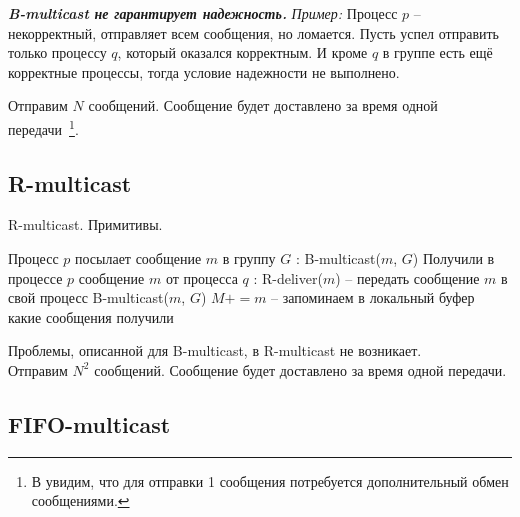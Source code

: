 \textbf{\textit{B-multicast не гарантирует надежность.}} \newline
\textit{Пример:} Процесс $p$ -- некорректный, отправляет всем сообщения, но ломается. Пусть успел отправить только процессу $q$, который оказался корректным. И кроме $q$ в группе есть ещё корректные процессы, тогда условие надежности не выполнено.

Отправим $N$ сообщений. Сообщение будет доставлено за время одной передачи~\footnote{
В  увидим, что для отправки 1 сообщения потребуется дополнительный обмен сообщениями.}.


\subsection*{R-multicast}\label{b19:part2}

\begin{algorithm}
\caption{R-multicast. Примитивы.}
\begin{algorithmic}

\State Процесс $p$ посылает сообщение $m$ в группу $G$
:
	\State B-multicast($m$, $G$)
\EndProcedure
\State
\State Получили в процессе $p$ сообщение $m$ от процесса $q$
:
		\State R-deliver($m$) -- передать сообщение $m$ в свой процесс
		\State B-multicast($m$, $G$)
		\State $M += m$ -- запоминаем в локальный буфер какие сообщения получили
	\EndIf
\EndProcedure

\end{algorithmic}
\end{algorithm}

Проблемы, описанной для B-multicast, в R-multicast не возникает. \\
Отправим $N^2$ сообщений. Сообщение будет доставлено за время одной передачи.

\newpage
\subsection*{FIFO-multicast}\label{b19:part3}

